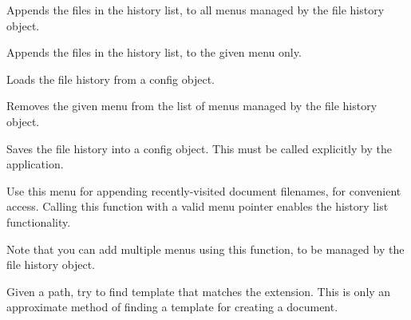 Appends the files in the history list, to all menus managed by the file history object.


Appends the files in the history list, to the given menu only.

\label{wxdocmanagerfilehistoryload}


Loads the file history from a config object.



\label{wxdocmanagerfilehistoryremovemenu}


Removes the given menu from the list of menus managed by the file history object.

\label{wxdocmanagerfilehistorysave}


Saves the file history into a config object. This must be called
explicitly by the application.



\label{wxdocmanagerfilehistoryusemenu}


Use this menu for appending recently-visited document filenames, for convenient
access. Calling this function with a valid menu pointer enables the history
list functionality.

Note that you can add multiple menus using this function, to be managed by the
file history object.



Given a path, try to find template that matches the extension. This is only
an approximate method of finding a template for creating a document.

